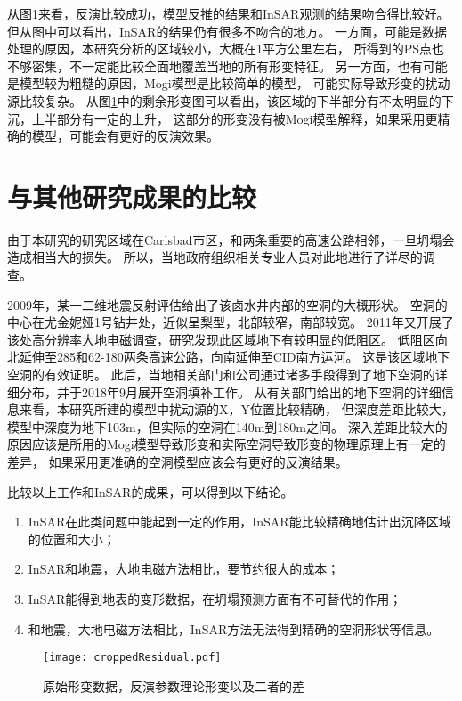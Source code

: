 从图\ref{fig:residual}来看，反演比较成功，模型反推的结果和InSAR观测的结果吻合得比较好。
但从图中可以看出，InSAR的结果仍有很多不吻合的地方。
一方面，可能是数据处理的原因，本研究分析的区域较小，大概在1平方公里左右，
所得到的PS点也不够密集，不一定能比较全面地覆盖当地的所有形变特征。
另一方面，也有可能是模型较为粗糙的原因，Mogi模型是比较简单的模型，
可能实际导致形变的扰动源比较复杂。
从图\ref{fig:residual}中的剩余形变图可以看出，该区域的下半部分有不太明显的下沉，上半部分有一定的上升，
这部分的形变没有被Mogi模型解释，如果采用更精确的模型，可能会有更好的反演效果。

\section{与其他研究成果的比较}
由于本研究的研究区域在Carlsbad市区，和两条重要的高速公路相邻，一旦坍塌会造成相当大的损失。
所以，当地政府组织相关专业人员对此地进行了详尽的调查。

2009年，某一二维地震反射评估给出了该卤水井内部的空洞的大概形状。
空洞的中心在尤金妮娅1号钻井处，近似呈梨型，北部较窄，南部较宽。
2011年又开展了该处高分辨率大地电磁调查\cite{landElectricalResistivitySurvey2011}，研究发现此区域地下有较明显的低阻区。
低阻区向北延伸至285和62-180两条高速公路，向南延伸至CID南方运河。
这是该区域地下空洞的有效证明。
此后，当地相关部门和公司通过诸多手段得到了地下空洞的详细分布，并于2018年9月展开空洞填补工作。
从有关部门给出的地下空洞的详细信息来看，本研究所建的模型中扰动源的X，Y位置比较精确，
但深度差距比较大，模型中深度为地下103m，但实际的空洞在140m到180m之间。
深入差距比较大的原因应该是所用的Mogi模型导致形变和实际空洞导致形变的物理原理上有一定的差异，
如果采用更准确的空洞模型应该会有更好的反演结果。

比较以上工作和InSAR的成果，可以得到以下结论。
\begin{enumerate}
    \item InSAR在此类问题中能起到一定的作用，InSAR能比较精确地估计出沉降区域的位置和大小；
    \item InSAR和地震，大地电磁方法相比，要节约很大的成本；
    \item InSAR能得到地表的变形数据，在坍塌预测方面有不可替代的作用；
    \item 和地震，大地电磁方法相比，InSAR方法无法得到精确的空洞形状等信息。
\end{enumerate}

\begin{landscape}
\begin{figure}[htb]
    \centering
    \texttt{[image: croppedResidual.pdf]}
    \caption{原始形变数据，反演参数理论形变以及二者的差}
    \label{fig:residual}
\end{figure}
\end{landscape}